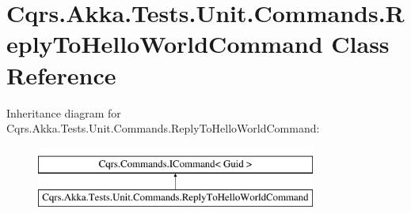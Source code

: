 \hypertarget{classCqrs_1_1Akka_1_1Tests_1_1Unit_1_1Commands_1_1ReplyToHelloWorldCommand}{}\section{Cqrs.\+Akka.\+Tests.\+Unit.\+Commands.\+Reply\+To\+Hello\+World\+Command Class Reference}
\label{classCqrs_1_1Akka_1_1Tests_1_1Unit_1_1Commands_1_1ReplyToHelloWorldCommand}
Inheritance diagram for Cqrs.\+Akka.\+Tests.\+Unit.\+Commands.\+Reply\+To\+Hello\+World\+Command\+:\begin{figure}[H]
\begin{center}
\leavevmode
\includegraphics[height=2.000000cm]{classCqrs_1_1Akka_1_1Tests_1_1Unit_1_1Commands_1_1ReplyToHelloWorldCommand}
\end{center}
\end{figure}
